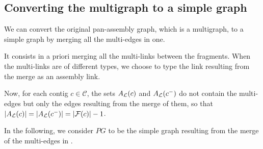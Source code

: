 \subsection{Converting the multigraph to a simple graph}

We can convert the original pan-assembly graph, which is a multigraph, to a simple graph by merging all the multi-edges in one.

It consists in a priori merging all the multi-links between the fragments.
When the multi-links are of different types, we choose to type the link resulting from the merge as an assembly link.

\begin{notebox}
  Now, for each contig \(c \in \mathcal{C}\), the sets \(A_{\mathcal{L}}{}(c)\) and \(A_{\mathcal{L}}{}(c^-)\) do not contain the multi-edges but only the edges resulting from the merge of them, so that \(|A_{\mathcal{L}}{}(c)| = |A_{\mathcal{L}}{}(c^-)| = |\mathcal{F}{}(c)| - 1\).
\end{notebox}

In the following, we consider \(PG\) to be the simple graph resulting from the merge of the multi-edges in \ELinks{}.
